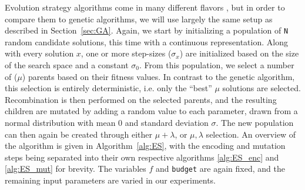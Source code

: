 \documentclass{article}
\begin{document}
\newpage

Evolution strategy algorithms come in many different flavors \cite{CMA-ES}\cite{NES}, but in order to compare them to genetic algorithms, we will use largely the same setup as described in Section~\ref{sec:GA}.
Again, we start by initializing a population of \texttt{N} random candidate solutions, this time with a continuous representation.
Along with every solution $x$, one or more step-sizes ($\sigma_x$) are initialized based on the size of the search space and a constant $\sigma_0$.
From this population, we select a number of ($\mu$) parents based on their fitness values.
In contrast to the genetic algorithm, this selection is entirely deterministic, i.e. only the ``best'' $\mu$ solutions are selected.
Recombination is then performed on the selected parents, and the resulting children are mutated by adding a random value to each parameter, drawn from a normal distribution with mean 0 and standard deviation $\sigma$.
The new population can then again be created through either $\mu+\lambda$, or $\mu,\lambda$ selection.
An overview of the algorithm is given in Algorithm~\ref{alg:ES}, with the encoding and mutation steps being separated into their own respective algorithms \ref{alg:ES_enc} and \ref{alg:ES_mut} for brevity.
The variables $f$ and \texttt{budget} are again fixed, and the remaining input parameters are varied in our experiments.

\end{document}
